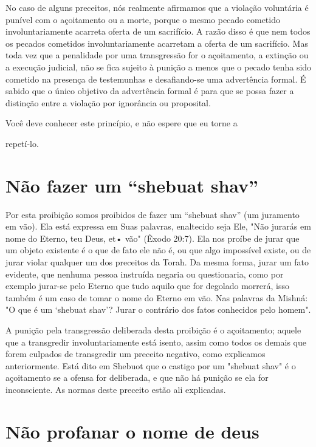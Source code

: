 No caso de alguns preceitos, nós realmente afirmamos que a viola­ção
voluntária é punível com o açoitamento ou a morte, porque o mesmo
pe­cado cometido involuntariamente acarreta oferta de um sacrifício. A
razão dis­so é que nem todos os pecados cometidos involuntariamente
acarretam a ofer­ta de um sacrifício. Mas toda vez que a penalidade por
uma transgressão for o açoitamento, a extinção ou a execução judicial,
não se fica sujeito à punição a menos que o pecado tenha sido cometido
na presença de testemunhas e desafiando-se uma advertência formal. É
sabido que o único objetivo da adver­tência formal é para que se possa
fazer a distinção entre a violação por ignorân­cia ou proposital.


Você deve conhecer este princípio, e não espere que eu torne a


repetí-lo.

\section{Não fazer um ``shebuat shav''}

Por esta proibição somos proibidos de fazer um ``shebuat shav'' (um
juramento em vão). Ela está expressa em Suas palavras, enaltecido seja
Ele, "Não jurarás em nome do Eterno, teu Deus, et• vão" (Êxodo 20:7).
Ela nos proíbe de jurar que um objeto existente é o que de fato ele não
é, ou que algo impossí­vel existe, ou de jurar violar qualquer um dos
preceitos da Torah. Da mesma forma, jurar um fato evidente, que nenhuma
pessoa instruída negaria ou ques­tionaria, como por exemplo jurar-se
pelo Eterno que tudo aquilo que for dego­lado morrerá, isso também é um
caso de tomar o nome do Eterno em vão. Nas palavras da Mishná: "O que é
um `shebuat shav'? Jurar o contrário dos fatos conhecidos pelo homem".

A punição pela transgressão deliberada desta proibição é o açoita­mento;
aquele que a transgredir involuntariamente está isento, assim como
to­dos os demais que forem culpados de transgredir um preceito negativo,
como explicamos anteriormente. Está dito em Shebuot que o castigo por um
"she­buat shav" é o açoitamento se a ofensa for deliberada, e que não há
punição se ela for inconsciente. As normas deste preceito estão ali
explicadas.

\section{Não profanar o nome de deus}

